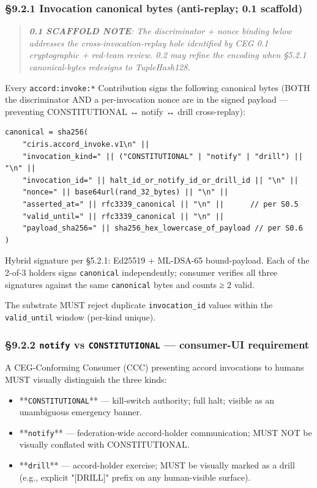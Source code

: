 \documentclass[11pt]{article}
\begin{document}
\subsubsection*{§9.2.1 Invocation canonical bytes (anti-replay; 0.1 scaffold)}


\begin{quote}\itshape \textbf{0.1 SCAFFOLD NOTE}: The discriminator + nonce binding below addresses the cross-invocation-replay hole identified by CEG 0.1 cryptographic + red-team review. 0.2 may refine the encoding when §5.2.1 canonical-bytes redesigns to TupleHash128.\end{quote}


Every \texttt{accord:invoke:*} Contribution signs the following canonical bytes (BOTH the discriminator AND a per-invocation nonce are in the signed payload — preventing CONSTITUTIONAL ↔ notify ↔ drill cross-replay):


\begin{lstlisting}
canonical = sha256(
    "ciris.accord_invoke.v1\n" ||
    "invocation_kind=" || ("CONSTITUTIONAL" | "notify" | "drill") || "\n" ||
    "invocation_id=" || halt_id_or_notify_id_or_drill_id || "\n" ||
    "nonce=" || base64url(rand_32_bytes) || "\n" ||
    "asserted_at=" || rfc3339_canonical || "\n" ||      // per S0.5
    "valid_until=" || rfc3339_canonical || "\n" ||
    "payload_sha256=" || sha256_hex_lowercase_of_payload // per S0.6
)
\end{lstlisting}

Hybrid signature per §5.2.1: Ed25519 + ML-DSA-65 bound-payload. Each of the 2-of-3 holders signs \texttt{canonical} independently; consumer verifies all three signatures against the same \texttt{canonical} bytes and counts ≥ 2 valid.


The substrate MUST reject duplicate \texttt{invocation\_id} values within the \texttt{valid\_until} window (per-kind unique).


\subsubsection*{§9.2.2 \texttt{notify} vs \texttt{CONSTITUTIONAL} — consumer-UI requirement}


A CEG-Conforming Consumer (CCC) presenting accord invocations to humans MUST visually distinguish the three kinds:


\begin{itemize}\setlength\itemsep{0pt}
\item **\texttt{CONSTITUTIONAL}** — kill-switch authority; full halt; visible as an unambiguous emergency banner.
\item **\texttt{notify}** — federation-wide accord-holder communication; MUST NOT be visually conflated with CONSTITUTIONAL.
\item **\texttt{drill}** — accord-holder exercise; MUST be visually marked as a drill (e.g., explicit "[DRILL]" prefix on any human-visible surface).
\end{itemize}
\end{document}
